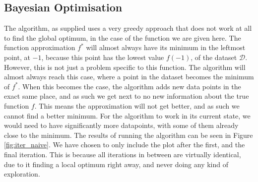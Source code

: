 \subsection{Bayesian Optimisation}
The algorithm, as supplied uses a very greedy approach that does not work at all to find the global optimum, in the case of the function we are given here. The function approximation $f^*$ will almost always have its minimum in the leftmost point, at $-1$, because this point has the lowest value $f(-1)$, of the dataset $\mathcal{D}$. However, this is not just a problem specific to this function. The algorithm will almost always reach this case, where a point in the dataset becomes the minimum of $f^*$. When this becomes the case, the algorithm adds new data points in the exact same place, and as such we get next to no new information about the true function $f$. This means the approximation will not get better, and as such we cannot find a better minimum. For the algorithm to work in its current state, we would need to have significantly more datapoints, with some of them already close to the minimum. The results of running the algorithm can be seen in Figure \ref{fig:iter_naive}. We have chosen to only include the plot after the first, and the final iteration. This is because all iterations in between are virtually identical, due to it finding a local optimum right away, and never doing any kind of exploration.


